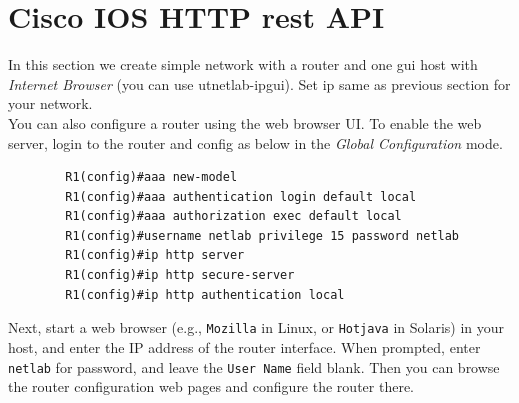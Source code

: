 \documentclass{../UTNetLab}
\begin{document}
\section{Cisco IOS HTTP rest API}
    In this section we create simple network with a router and one gui host with \textit{Internet Browser} (you can use utnetlab-ipgui). Set ip same as previous section for your network.\\
    You can also configure a router using the web browser UI. To enable the web server, login to the router and config as below  in the \textit{Global Configuration} mode. \\
    \begin{verbatim}
        R1(config)#aaa new-model
        R1(config)#aaa authentication login default local
        R1(config)#aaa authorization exec default local
        R1(config)#username netlab privilege 15 password netlab
        R1(config)#ip http server
        R1(config)#ip http secure-server
        R1(config)#ip http authentication local
    \end{verbatim}
    Next, start a web browser (e.g., \texttt{Mozilla} in Linux, or \texttt{Hotjava} in Solaris) in your host, and enter the IP address of the router interface. When prompted, enter \texttt{netlab} for password, and leave the \texttt{User Name} field blank. Then you can browse the router configuration web pages and configure the router there.
\end{document}
